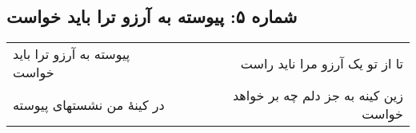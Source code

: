 \begin{center}
\section*{شماره ۵: پیوسته به آرزو ترا باید خواست}
\label{sec:005}
\begin{longtable}{l p{0.5cm} r}
پیوسته به آرزو ترا باید خواست
&&
تا از تو یک آرزو مرا ناید راست
\\
در کینهٔ من نشستهای پیوسته
&&
زین کینه به جز دلم چه بر خواهد خواست
\\
\end{longtable}
\end{center}
